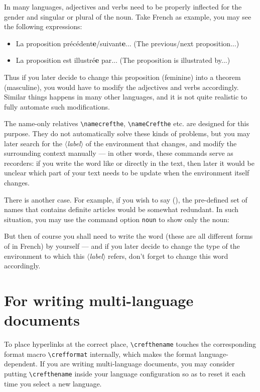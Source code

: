 \documentclass[classical]{einfart}
\newcommand{\meta}[1]{$\langle${\normalfont\itshape#1}$\rangle$}
\newcommand{\commandoption}[1]{\texttt{\textcolor{code-keys}{#1}}}
\begin{document}
In many languages, adjectives and verbs need to be properly inflected for the gender and singular or plural of the noun. Take French as example, you may see the following expressions:
\begin{itemize}
    \item La proposition précédent\textbf{e}/suivant\textbf{e}... (The previous/next proposition...)
    \item La proposition est illustré\textbf{e} par... (The proposition is illustrated by...)
\end{itemize}
Thus if you later decide to change this proposition (feminine) into a theorem (masculine), you would have to modify the adjectives and verbs accordingly. Similar things happens in many other languages, and it is not quite realistic to fully automate such modifications.

The name-only relatives \lstinline|\namecrefthe|, \lstinline|\nameCrefthe| etc. are designed for this purpose. They do not automatically solve these kinds of problems, but you may later search for the \meta{label} of the environment that changes, and modify the surrounding context manually --- in other words, these commands serve as recorders: if you write the word like  or  directly in the text, then later it would be unclear which part of your text needs to be update when the environment itself changes.

There is another case. For example, if you wish to say  (), the pre-defined set of names that contains definite articles would be somewhat redundant. In such situation, you may use the command option \commandoption{noun} to show only the noun:

\begin{code}
\namecref[(*\commandoption{noun}*)]{(*\meta{label}*)}
\end{code}

But then of course you shall need to write the word  (these are all different forms of  in French) by yourself --- and if you later decide to change the type of the environment to which this \meta{label} refers, don't forget to change this word accordingly.

\section{For writing multi-language documents}

To place hyperlinks at the correct place, \lstinline|\crefthename| touches the corresponding format macro \lstinline|\crefformat| internally, which makes the format language-dependent. If you are writing multi-language documents, you may consider putting \lstinline|\crefthename| inside your language configuration so as to reset it each time you select a new language.
\end{document}
